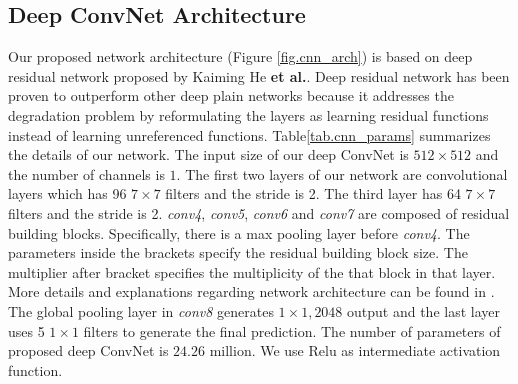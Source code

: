 \subsection{Deep ConvNet Architecture}
\label{sec_cnn}
Our proposed network architecture (Figure \ref{fig.cnn_arch})  is based on deep residual network proposed by Kaiming He \textbf{et al.}\cite{he2016deep}. Deep residual  network has been proven to outperform other deep plain networks because it addresses the degradation problem by reformulating the layers as learning residual functions instead of learning unreferenced functions. 
%
Table\ref{tab.cnn_params} summarizes the details of our network. The input size of our deep ConvNet is $512\times512$ and the number of channels is $1$.
The first two layers of our network are convolutional layers which has 96 $7\times7$ filters and the stride is 2. The third layer has 64 $7\times7$ filters and the stride is 2. 
%
\textit{conv4}, \textit{conv5}, \textit{conv6} and \textit{conv7} are composed of residual building blocks. Specifically, there is a max pooling layer before  \textit{conv4}. The parameters inside the brackets specify the residual building block size. 
%
The multiplier after bracket specifies the multiplicity of the that block in that layer.  More details and explanations regarding network architecture can be found in \cite{he2016deep}. 
%
The global pooling layer in \textit{conv8} generates $1\times1,2048$ output and the last layer uses 5 $1\times1$ filters to generate the final prediction. 
%
The number of parameters of proposed deep ConvNet is $24.26$ million. 
%
We use Relu\cite{nair2010rectified} as intermediate activation function.
%

